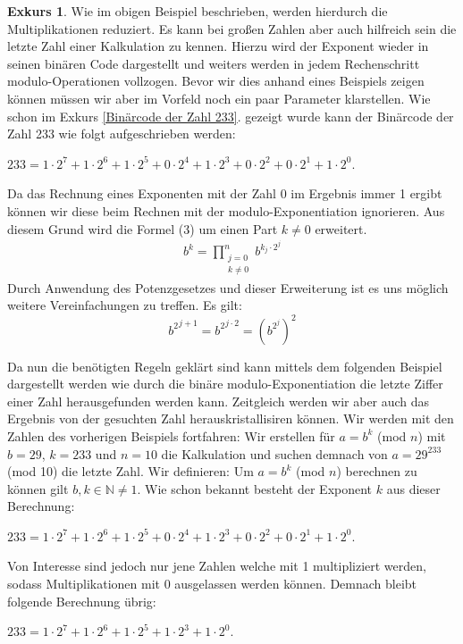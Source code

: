 \documentclass[12pt,a4paper]{article}
\theoremstyle{definition}
\newtheorem{exkurs}{Exkurs}
\begin{document}
\begin{exkurs}
Wie im obigen Beispiel beschrieben, werden hierdurch die Multiplikationen reduziert.
Es kann bei großen Zahlen aber auch hilfreich sein die letzte Zahl einer Kalkulation zu kennen.
Hierzu wird der Exponent wieder in seinen binären Code dargestellt und weiters werden in jedem Rechenschritt modulo-Operationen vollzogen.\newline
Bevor wir dies anhand eines Beispiels zeigen können müssen wir aber im Vorfeld noch ein paar Parameter klarstellen. Wie schon im Exkurs \ref{Binärcode der Zahl 233}. gezeigt wurde kann der Binärcode der Zahl 233 wie folgt aufgeschrieben werden:
\begin{center}
$233 = 1 \cdot 2^7 + 1 \cdot 2^6 + 1 \cdot2^5 + 0 \cdot2^4 + 1 \cdot 2^3 + 0 \cdot2^2 + 0 \cdot 2^1 + 1 \cdot 2^0$.
\end{center}
Da das Rechnung eines Exponenten mit der Zahl 0 im Ergebnis immer 1 ergibt können wir diese beim Rechnen mit der modulo-Exponentiation ignorieren. Aus diesem Grund wird die Formel (3) um einen Part $k \neq 0$ erweitert.
\begin{align}
b^k = \prod_{\substack{j=0\\k\neq0}}^n b^{k_j \cdot 2^j}
\end{align}
Durch Anwendung des Potenzgesetzes und dieser Erweiterung ist es uns möglich weitere Vereinfachungen zu treffen. Es gilt:
\[{b^2}^{j+1} = {b^2}^{j \cdot 2} = (b^{2^j})^2\]


Da nun die benötigten Regeln geklärt sind kann mittels dem folgenden Beispiel dargestellt werden wie durch die binäre modulo-Exponentiation die letzte Ziffer einer Zahl herausgefunden werden kann. Zeitgleich werden wir aber auch das Ergebnis von der gesuchten Zahl herauskristallisiren können.
Wir werden mit den Zahlen des vorherigen Beispiels fortfahren:
\newline
Wir erstellen für $a = b^k$ (mod $n$) mit $b = 29$, $k = 233$ und $n = 10$ die Kalkulation und suchen demnach von $a = 29^{233}$ (mod 10) die letzte Zahl.\newline
Wir definieren: Um $a = b^k$ (mod $n$) berechnen zu können gilt $b, k \in \mathbb{N} \neq 1$.
Wie schon bekannt besteht der Exponent $k$ aus dieser Berechnung:
\begin{center}
$233 = 1 \cdot 2^7 + 1 \cdot 2^6 + 1 \cdot2^5 + 0 \cdot2^4 + 1 \cdot 2^3 + 0 \cdot2^2 + 0 \cdot 2^1 + 1 \cdot 2^0$.
\end{center}

Von Interesse sind jedoch nur jene Zahlen welche mit 1 multipliziert werden, sodass Multiplikationen mit 0 ausgelassen werden können.
Demnach bleibt folgende Berechnung übrig:
\begin{center}
$233 = 1 \cdot 2^7 + 1 \cdot 2^6 + 1 \cdot2^5 + 1 \cdot 2^3 + 1 \cdot 2^0$.
\end{center}


\end{exkurs}
\end{document}
